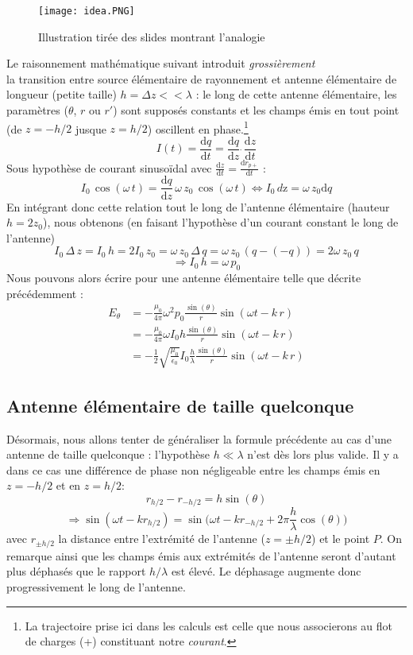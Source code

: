\begin{figure}[h]\centering
\texttt{[image: idea.PNG]}
\caption{Illustration tirée des slides montrant l'analogie}
\label{fig:ae}
\end{figure}

Le raisonnement mathématique suivant introduit \textit{grossièrement} \\la transition entre source élémentaire de rayonnement et antenne élémentaire de longueur (petite taille) $ h = \Delta z << \lambda$ : le long de cette antenne élémentaire, les paramètres ($\theta$, $r$ ou $r'$) sont supposés constants et les champs émis en tout point (de $z=-h/2$ jusque $z=h/2$) oscillent en phase.\footnote{La trajectoire prise ici dans les calculs est celle que nous associerons au flot de charges (+) constituant notre \textit{courant}.} \[ I(t) = \frac{\textrm{d}q}{\textrm{d}t} = \frac{\textrm{d}q}{\textrm{d}z}\,\dot\,\frac{\textrm{d}z}{\textrm{d}t}\] Sous hypothèse de courant sinusoïdal avec $\frac{\textrm{d}z}{\textrm{d}t} = \frac{\textrm{d}r_{p+}}{\textrm{d}t}$ :
\[I_{0}\,\cos(\omega\,t) = \frac{\textrm{d}q}{\textrm{d}z}\,\omega\,z_0\,\cos(\omega\,t) \Leftrightarrow I_0\,d\textrm{z} =\omega \, z_0 \textrm{d}q \]
En intégrant donc cette relation tout le long de l'antenne élémentaire (hauteur $h = 2z_0$), nous obtenons (en faisant l'hypothèse d'un courant constant le long de l'antenne) \[ I_0\,\Delta\,z = I_0 \,h = 2I_0\,z_0 = \omega \,z_0\,\Delta\,q = \omega\, z_0 \, (q-(-q)) = 2\omega\,z_0\,q\]
\[\Rightarrow I_0\,h = \omega\,p_0\]
Nous pouvons alors écrire pour une antenne élémentaire telle que décrite précédemment : 
\begin{align*}
    E_\theta & = -\frac{\mu_0}{4\pi}\omega^2p_0\frac{\sin(\theta)}{r}\sin(\omega t-k\,r)\\
    & = -\frac{\mu_0}{4\pi}\omega I_0h\frac{\sin(\theta)}{r}\sin(\omega t-k\,r)\\
    & = -\frac{1}{2}\sqrt{\frac{\mu_0}{\epsilon_0}}I_0 \frac{h}{\lambda}\frac{\sin(\theta)}{r}\sin(\omega t-k\, r)
\end{align*}


\subsection{Antenne élémentaire de taille quelconque}

Désormais, nous allons tenter de généraliser la formule précédente au cas d'une antenne de taille quelconque : l'hypothèse $h\ll \lambda$ n'est dès lors plus valide. Il y a dans ce cas une différence de phase non négligeable entre les champs émis en $z=-h/2$ et en $z=h/2$:
$$ r_{h/2}-r_{-h/2}=h\sin(\theta)$$
$$\Rightarrow \sin(\omega t-kr_{h/2})=\sin\bigg(\omega t-kr_{-h/2}+2\pi\frac{h}{\lambda}\cos(\theta)\bigg)$$
avec $r_{\pm h/2}$ la distance entre l'extrémité de l'antenne ($z=\pm h/2$) et le point $P$. On remarque ainsi que les champs émis aux extrémités de l'antenne seront d'autant plus déphasés que le rapport $h/\lambda$ est élevé. Le déphasage augmente donc progressivement le long de l'antenne.

